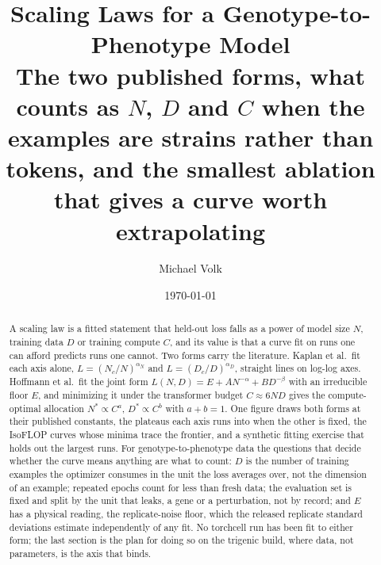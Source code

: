 \documentclass[10pt,a4paper]{article}
\title{\vspace{-1.5em}Scaling Laws for a Genotype-to-Phenotype Model\\
  {\large The two published forms, what counts as $N$, $D$ and $C$ when the
   examples are strains rather than tokens, and the smallest ablation that gives a
   curve worth extrapolating}}
\author{Michael Volk}
\date{\today}
\begin{document}
\maketitle
\thispagestyle{empty}

\begin{abstract}
\noindent
A scaling law is a fitted statement that held-out loss falls as a power of model
size $N$, training data $D$ or training compute $C$, and its value is that a curve
fit on runs one can afford predicts runs one cannot. Two forms carry the
literature. Kaplan et al.\ fit each axis alone, $L = (N_c/N)^{\alpha_N}$ and
$L = (D_c/D)^{\alpha_D}$, straight lines on log-log axes. Hoffmann et al.\ fit the
joint form $L(N, D) = E + A N^{-\alpha} + B D^{-\beta}$ with an irreducible floor
$E$, and minimizing it under the transformer budget $C \approx 6ND$ gives the
compute-optimal allocation $N^* \propto C^{a}$, $D^* \propto C^{b}$ with
$a + b = 1$. One figure draws both forms at their published constants, the plateaus
each axis runs into when the other is fixed, the IsoFLOP curves whose minima trace
the frontier, and a synthetic fitting exercise that holds out the largest runs. For
genotype-to-phenotype data the questions that decide whether the curve means
anything are what to count: $D$ is the number of training examples the optimizer
consumes in the unit the loss averages over, not the dimension of an example;
repeated epochs count for less than fresh data; the evaluation set is fixed and
split by the unit that leaks, a gene or a perturbation, not by record; and $E$ has
a physical reading, the replicate-noise floor, which the released replicate
standard deviations estimate independently of any fit. No torchcell run has been
fit to either form; the last section is the plan for doing so on the trigenic
build, where data, not parameters, is the axis that binds.
\end{abstract}

\vspace{0.5em}
\tccontents
\clearpage








\end{document}
